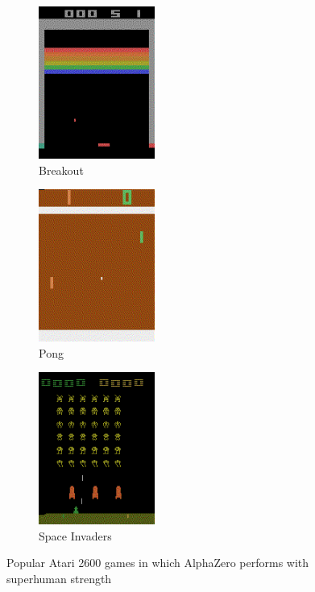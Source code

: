 \begin{figure}[H]
  \centering
  \begin{subfigure}{0.26\linewidth}
    \includegraphics[height=5cm]{figures/images/breakout.png}
    \caption{Breakout}
  \end{subfigure}
  \hfill
  \begin{subfigure}{0.25\linewidth}
    \includegraphics[height=5cm]{figures/images/pong.png}
    \caption{Pong}
  \end{subfigure}
  \hfill
  \begin{subfigure}{0.26\linewidth}
    \includegraphics[height=5cm]{figures/images/space_invaders.png}
    \caption{Space Invaders}
  \end{subfigure}
  \caption[Atari games]{Popular Atari 2600 games in which AlphaZero performs with superhuman strength \cite{brockman2016gym}}
  \label{fig:atari_games}
\end{figure}
